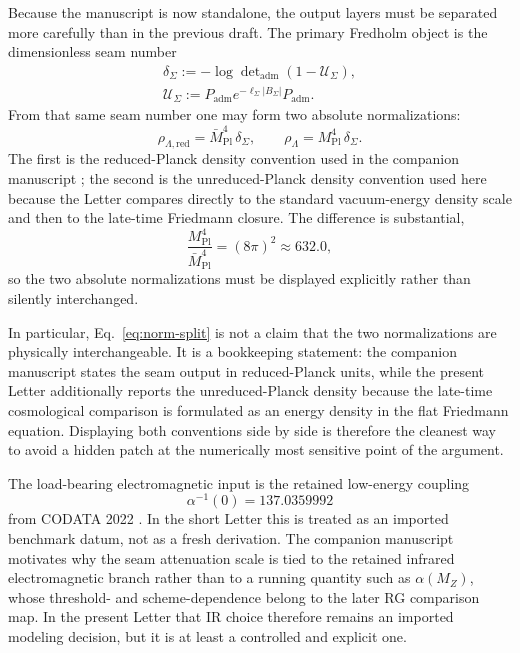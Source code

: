 \documentclass[aps,prl,reprint,superscriptaddress,longbibliography,nofootinbib,floatfix]{revtex4-2}
\newcommand{\Padm}{P_{\mathrm{adm}}}
\newcommand{\Mpl}{M_{\mathrm{Pl}}}
\newcommand{\Mplred}{\bar M_{\mathrm{Pl}}}
\newcommand{\Seam}{\Sigma}
\newcommand{\USeam}{\mathcal U_{\Seam}}
\newcommand{\rhoLambda}{\rho_{\Lambda}}
\newcommand{\rhoLambdaRed}{\rho_{\Lambda,\mathrm{red}}}
\begin{document}
Because the manuscript is now standalone, the output layers must be separated more carefully than in the previous draft. The primary Fredholm object is the dimensionless seam number
\begin{equation}
\begin{aligned}
\delta_{\Seam}
:=
-\log\det\nolimits_{\mathrm{adm}}(1-\USeam),\\
\USeam:=\Padm e^{-\ell_{\Seam}|B_{\Seam}|}\Padm.
\end{aligned}
\label{eq:delta-def}
\end{equation}
From that same seam number one may form two absolute normalizations:
\begin{equation}
\rhoLambdaRed
=
\Mplred^4\,\delta_{\Seam},
\qquad
\rhoLambda
=
\Mpl^4\,\delta_{\Seam}.
\label{eq:norm-split}
\end{equation}
The first is the reduced-Planck density convention used in the companion manuscript \cite{tfpt31}; the second is the unreduced-Planck density convention used here because the Letter compares directly to the standard vacuum-energy density scale and then to the late-time Friedmann closure. The difference is substantial,
\[
\frac{\Mpl^4}{\Mplred^4}
=
(8\pi)^2
\approx
632.0,
\]
so the two absolute normalizations must be displayed explicitly rather than silently interchanged.

In particular, Eq.~\eqref{eq:norm-split} is not a claim that the two normalizations are physically interchangeable. It is a bookkeeping statement: the companion manuscript states the seam output in reduced-Planck units, while the present Letter additionally reports the unreduced-Planck density because the late-time cosmological comparison is formulated as an energy density in the flat Friedmann equation. Displaying both conventions side by side is therefore the cleanest way to avoid a hidden patch at the numerically most sensitive point of the argument.

The load-bearing electromagnetic input is the retained low-energy coupling
\[
\alpha^{-1}(0)=137.0359992
\]
from CODATA 2022 \cite{codata2022}. In the short Letter this is treated as an imported benchmark datum, not as a fresh derivation. The companion manuscript motivates why the seam attenuation scale is tied to the retained infrared electromagnetic branch rather than to a running quantity such as $\alpha(M_Z)$, whose threshold- and scheme-dependence belong to the later RG comparison map. In the present Letter that IR choice therefore remains an imported modeling decision, but it is at least a controlled and explicit one.
\end{document}
